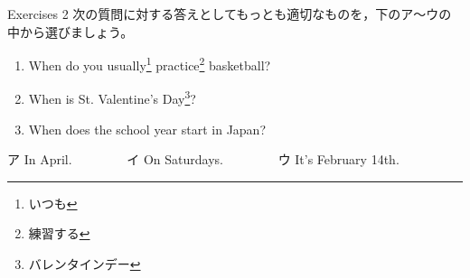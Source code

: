 \documentclass[aspectratio=169,xcolor={dvipsnames,table}]{beamer}
\begin{document}
\begin{frame}[plain]{Exercises 2}
 次の質問に対する答えとしてもっとも適切なものを，下のア～ウの中から選びましょう。

\begin{enumerate}
 \item When do you usually\footnote{いつも} practice\footnote{練習する} basketball?\hspace{10pt}\hspace{21pt}
 \item When is St. Valentine's Day\footnote{バレンタインデー}?\hspace{80pt}\hspace{12pt}
 \item When does the school year start in Japan?\hspace{15pt}\hspace{50pt}
\end{enumerate}

\begin{tcolorbox}
\centering
ア In April.~~~~~~~~%
イ On Saturdays.~~~~~~~~%
ウ It's February 14th. 
\end{tcolorbox}

%
\mbox{}\hfill{}


\end{frame}
\end{document}

